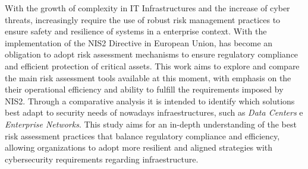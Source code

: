 
%

With the growth of complexity in IT Infrastructures and the increase of cyber threats, increasingly require the use of robust risk management practices
 to ensure safety and resilience of systems in a enterprise context. With the implementation of the NIS2 Directive in European Union, has become
 an obligation to adopt risk assessment mechanisms to ensure regulatory compliance and efficient protection of critical assets. This work aims to explore
 and compare the main risk assessment tools available at this moment, with emphasis on the their operational efficiency and ability to fulfill the requirements imposed by NIS2.
Through a comparative analysis it is intended to identify which solutions best adapt to security needs of nowadays infraestructures,
 such as \textit{Data Centers} e \textit{Enterprise Networks}. This study aims for an in-depth understanding of the best risk assessment practices that balance regulatory compliance and efficiency, 
allowing organizations to adopt more resilient and aligned strategies with cybersecurity requirements regarding infraestructure.

